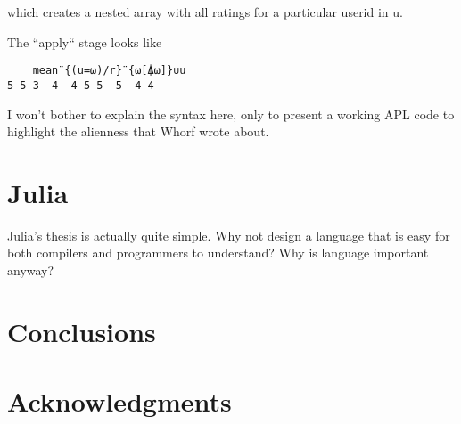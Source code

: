 \documentclass[11pt]{asaproc}
\begin{document}
which creates a nested array with all ratings for a particular userid in u.

The ``apply`` stage looks like

\begin{lstlisting}
    mean¨{(u=⍵)/r}¨{⍵[⍋⍵]}∪u
5 5 3  4  4 5 5  5  4 4
\end{lstlisting}


I won't bother to explain the syntax here, only to present a working APL code
to highlight the alienness that Whorf wrote about.

\section{Julia}

Julia's thesis is actually quite simple.
Why not design a language that is easy for both compilers and programmers to understand?
Why is language important anyway?

\section{Conclusions}

\section*{Acknowledgments}


\end{document}

